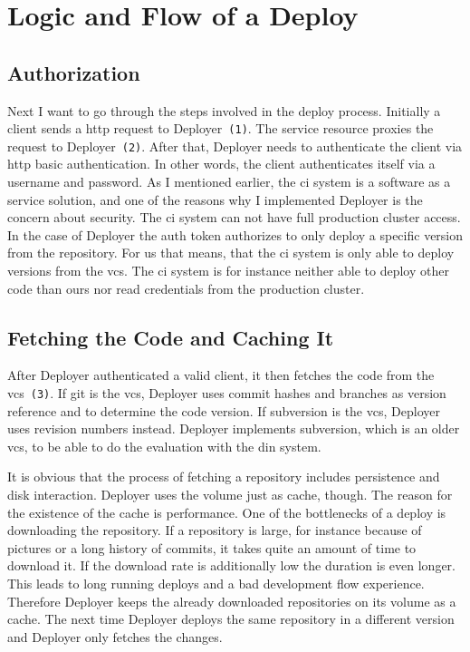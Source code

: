 \section{Logic and Flow of a Deploy}

\subsection{Authorization}

Next I want to go through the steps involved in the deploy process. Initially a client
sends a http request to Deployer~\texttt{(1)}. The service resource proxies the request
to Deployer~\texttt{(2)}. After that, Deployer needs to authenticate the client via http
basic authentication. In other words, the client authenticates itself via a username and
password. As I mentioned earlier, the \gls{ci} system is a software as a service solution,
and one of the reasons why I implemented Deployer is the concern about security. The
\gls{ci} system can not have full production cluster access. In the case of Deployer the
auth token authorizes to only deploy a specific version from the repository. For us that
means, that the \gls{ci} system is only able to deploy versions from the \gls{vcs}. The
\gls{ci} system is for instance neither able to deploy other code than ours nor read
credentials from the production cluster.

\subsection{Fetching the Code and Caching It}
\label{sec:cache}

After Deployer authenticated a valid client, it then fetches the code from the
\gls{vcs}~\texttt{(3)}. If git is the \gls{vcs}, Deployer uses commit hashes and branches
as version reference and to determine the code version. If subversion is the \gls{vcs},
Deployer uses revision numbers instead. Deployer implements subversion, which is an older
\gls{vcs}, to be able to do the evaluation with the \gls{din} system.

It is obvious that the process of fetching a repository includes persistence and disk
interaction. Deployer uses the volume just as cache, though. The reason for the existence
of the cache is performance. One of the bottlenecks of a deploy is downloading the
repository. If a repository is large, for instance because of pictures or a long history
of commits, it takes quite an amount of time to download it. If the download rate is
additionally low the duration is even longer. This leads to long running deploys and a bad
development flow experience. Therefore Deployer keeps the already downloaded repositories
on its volume as a cache. The next time Deployer deploys the same repository in a
different version and Deployer only fetches the changes.

